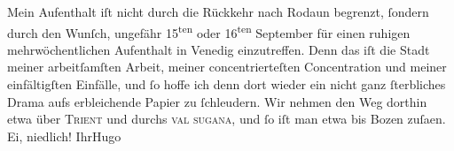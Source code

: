 \pstart
           Mein Aufenthalt iſt nicht durch die Rückkehr nach Rodaun begrenzt, ſondern durch den Wunſch, ungefähr {\pb}15\textsuperscript{ten} oder 16\textsuperscript{ten} September für einen
               ruhigen mehrwöchentlichen Aufenthalt in Venedig
               einzutreffen. Denn das iſt die Stadt meiner arbeitſamſten Arbeit, meiner
               concentrierteſten Concentration und meiner einfältigſten Einfälle, und ſo hoffe ich
               denn dort wieder ein nicht ganz ſterbliches Drama aufs erbleichende Papier zu ſchleudern. Wir nehmen den
               Weg dorthin etwa über \textsc{Trient} und durchs \textsc{val sugana}, und ſo iſt man etwa bis Bozen zuſa{\geminationm}en. Ei, niedlich!\pend
           \pstart Ihr\spacefill\mbox{Hugo}\pend{}\endnumbering{}  
      